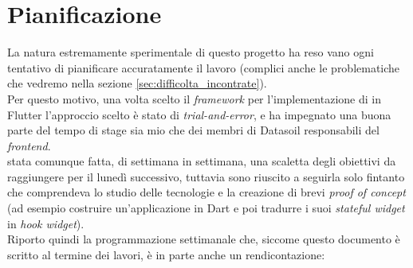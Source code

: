 \section{Pianificazione}
\label{sec:pianificazione}
La natura estremamente sperimentale di questo progetto ha reso vano ogni tentativo di pianificare accuratamente il lavoro (complici anche le problematiche che vedremo nella sezione \ref{sec:difficolta_incontrate}).\\
Per questo motivo, una volta scelto il \textit{framework} per l'implementazione di \asa{} in Flutter l'approccio scelto è stato di \textit{trial-and-error}, e ha impegnato una buona parte del tempo di stage sia mio che dei membri di Datasoil responsabili del \textit{frontend}.\\
\e{} stata comunque fatta, di settimana in settimana, una scaletta degli obiettivi da raggiungere per il lunedì successivo, tuttavia sono riuscito a seguirla solo fintanto che comprendeva lo studio delle tecnologie e la creazione di brevi \textit{proof of concept} (ad esempio costruire un'applicazione in Dart e poi tradurre i suoi \textit{stateful widget} in \textit{hook widget}).\\
Riporto quindi la programmazione settimanale che, siccome questo documento è scritto al termine dei lavori, è in parte anche un rendicontazione:

